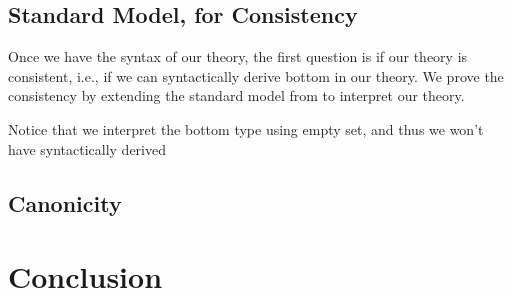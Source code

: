 \subsection{Standard Model, for Consistency}
Once we have the syntax of our theory, the first question is if our theory is consistent, i.e., if we can syntactically derive bottom in our theory. We prove the consistency by extending the standard model from \citep{kaposi2017type} to interpret our theory. 


Notice that we interpret the bottom type using empty set, and thus we won't have syntactically derived  


\subsection{Canonicity}
 


\section{Conclusion}
\label{sec:conclusion}

\setlength{\bibsep}{.8ex}


